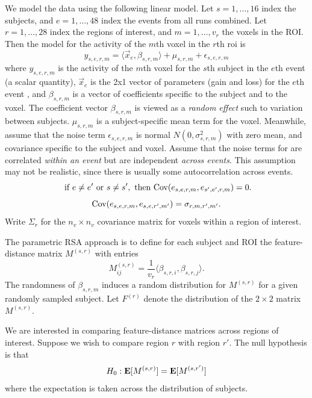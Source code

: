 \documentclass[12pt]{article}
\begin{document}
We model the data using the following linear model.
Let $s = 1,\hdots, 16$ index the subjects, and $e = 1,\hdots, 48$ index the events from all runs combined.
Let $r = 1,\hdots, 28$ index the regions of interest, and $m = 1,\hdots, v_r$ the voxels in the ROI.
Then the model for the activity of the $m$th voxel in the $r$th roi is
\[
y_{s, e, r, m} = \langle \vec{x}_{e}, \beta_{s, r, m} \rangle + \mu_{s, r, m} + \epsilon_{s, e, r, m}
\] 
where $y_{s, e, r, m}$ is the activity of the $m$th voxel for the $s$th subject in the $e$th event (a scalar quantity),
$\vec{x}_e$ is the 2x1 vector of parameters (gain and loss) for the $e$th event ,
and $\beta_{s, r, m}$ is a vector of coefficients specific to the subject and to the voxel.
The coefficient vector $\beta_{s, r, m}$ is viewed as a \emph{random effect} such to variation between subjects.
$\mu_{s, r, m}$ is a subject-specific mean term for the voxel.
Meanwhile, assume that the noise term $\epsilon_{s, e, r, m}$ is normal $N(0, \sigma^2_{s, r, m})$
with zero mean, and covariance specific to the subject and voxel.
Assume that the noise terms for are correlated \emph{within an event} but are independent \emph{across events}.  This assumption may not be realistic, since there is usually some autocorrelation across events.
\[
\text{ if }e \neq e' \text{ or }s \neq s', \text{ then }\text{Cov}(e_{s, e, r, m}, e_{s', e', r, m}) = 0 .
\]
\[
\text{Cov}(e_{s, e, r, m}, e_{s, e, r', m'}) = \sigma_{r,m,r',m'}.
\]
Write $\Sigma_{r}$ for the $n_v \times n_v$ covariance matrix for voxels within a region of interest.

The parametric RSA approach is to define for each subject and ROI the feature-distance matrix $M^{(s, r)}$ with entries
\[
M^{(s, r)}_{ij} = \frac{1}{v_r}\langle \beta_{s, r, i}, \beta_{s, r, j }\rangle.
\]
The randomness of $\beta_{s, r, m}$ induces a random distribution for $M^{(s, r)}$ for a given randomly sampled subject. Let $F^{(r)}$ denote the distribution of the $2 \times 2$ matrix $M^{(s, r)}$.

We are interested in comparing feature-distance matrices across regions of interest.
Suppose we wish to compare region $r$ with region $r'$.  The null hypothesis is that
\[
H_0: \textbf{E}[M^{(s, r)}] = \textbf{E}[M^{(s, r')}]
\]
where the expectation is taken across the distribution of subjects.
\end{document}
